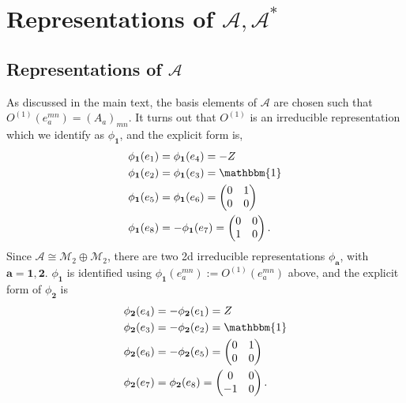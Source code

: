 \documentclass[prx, twocolumn, superscriptaddress, dvipsnames]{revtex4-2}
\theoremstyle{definition}
\newcommand{\bo}{\mathbbm{1}}
\newcommand{\mA}{\mathcal{A}}
\newcommand{\vbnt}{\mathbf{a}}
\begin{document}
\section{Representations of $\mA,\mA^*$}
\label{app:rep}
\subsection{Representations of $\mA$}
As discussed in the main text, the basis elements of $\mA$ are chosen such that $O^{(1)}(e_a^{mn})=(A_a)_{mn}$. It turns out that $O^{(1)}$ is an irreducible representation which we identify as $\phi_\mathbf{1}$, and the explicit form is,
\begin{equation}
    \begin{aligned}
        &\phi_\mathbf{1}(e_1)=\phi_\mathbf{1}(e_4)=-Z\\
        &\phi_\mathbf{1}(e_2)=\phi_\mathbf{1}(e_3)=\bo\\
        &\phi_\mathbf{1}(e_5)=\phi_\mathbf{1}(e_6)=\begin{pmatrix}
            0 & 1\\
            0 & 0
        \end{pmatrix}\\
        &\phi_\mathbf{1}(e_8)=-\phi_\mathbf{1}(e_7)=\begin{pmatrix}
            0 & 0\\
            1 & 0
        \end{pmatrix}.
    \end{aligned}
\end{equation}
Since $\mA\cong\mathcal{M}_2\oplus\mathcal{M}_2$, there are two 2d irreducible representations $\phi_{\vbnt}$, with $\vbnt=\mathbf{1},\mathbf{2}$. $\phi_\mathbf{1}$ is identified using $\phi_\mathbf{1}(e_a^{mn}):=O^{(1)}(e_a^{mn})$ above, and the explicit form of $\phi_\mathbf{2}$ is
\begin{equation}
\begin{aligned}
    &\phi_\mathbf{2}(e_4)=-\phi_\mathbf{2}(e_1)=Z\\
    &\phi_\mathbf{2}(e_3)=-\phi_\mathbf{2}(e_2)=\bo\\
&\phi_\mathbf{2}(e_6)=-\phi_\mathbf{2}(e_5)=\begin{pmatrix}
            0 & 1\\
            0 & 0
        \end{pmatrix}\\
&\phi_\mathbf{2}(e_7)=\phi_\mathbf{2}(e_8)=\begin{pmatrix}
            0 & 0\\
            -1 & 0
        \end{pmatrix}.
\end{aligned}
\end{equation}
\end{document}
